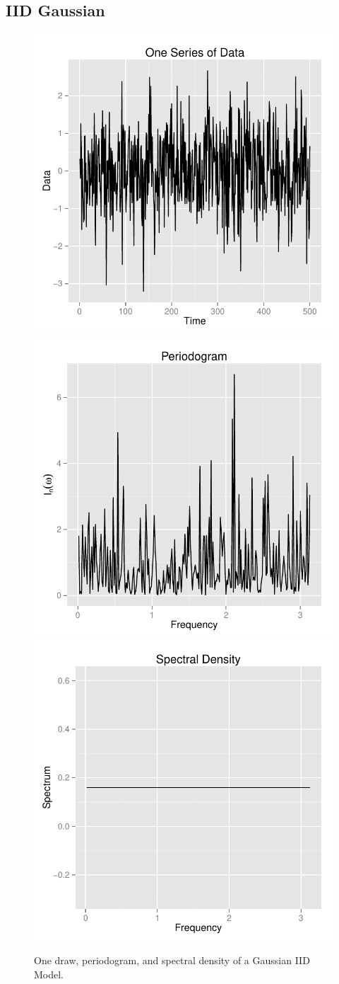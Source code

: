 \documentclass{article}\usepackage{graphicx, color}
\newenvironment{knitrout}{}{} %
\theoremstyle{plain}
\begin{document}
\subsection{IID Gaussian}
\begin{knitrout}
\color{fgcolor}\begin{figure}[H]

\includegraphics[width=.33\textwidth]{figure/inital-iid1} 
\includegraphics[width=.33\textwidth]{figure/inital-iid2} 
\includegraphics[width=.33\textwidth]{figure/inital-iid3} \caption[One draw, periodogram, and spectral density of a Gaussian IID Model]{One draw, periodogram, and spectral density of a Gaussian IID Model.\label{fig:inital-iid}}
\end{figure}


\end{knitrout}
\end{document}
